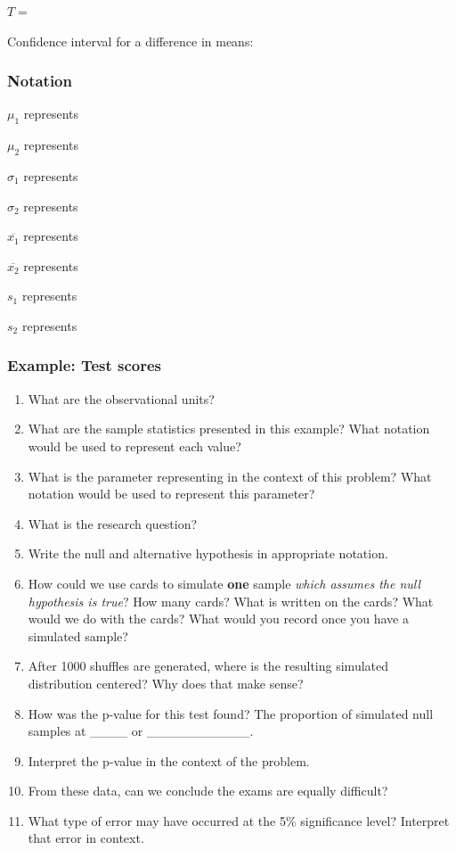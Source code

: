 \documentclass[
]{report}
\newcommand{\rgs}{\vspace{12pt}} %
\begin{document}
\(T=\)
\rgs

Confidence interval for a difference in means:
\rgs

\hypertarget{notation-4}{%
\subsubsection*{Notation}\label{notation-4}}

\(\mu_1\) represents
\rgs

\(\mu_2\) represents
\rgs

\(\sigma_1\) represents
\rgs

\(\sigma_2\) represents
\rgs

\(\overline{x_1}\) represents
\rgs

\(\overline{x_2}\) represents
\rgs

\(s_1\) represents
\rgs

\(s_2\) represents
\rgs

\hypertarget{example-test-scores}{%
\subsubsection*{Example: Test scores}\label{example-test-scores}}

\begin{enumerate}
\def\labelenumi{\arabic{enumi}.}
\item
  What are the observational units?
  \rgs
\item
  What are the sample statistics presented in this example? What notation would be used to represent each value?
  \rgs
\item
  What is the parameter representing in the context of this problem? What notation would be used to represent this parameter?
  \rgs
  \rgs
\item
  What is the research question?
  \rgs
\item
  Write the null and alternative hypothesis in appropriate notation.
  \rgs
\item
  How could we use cards to simulate \textbf{one} sample \emph{which assumes the null hypothesis is true}? How many cards? What is written on the cards? What would we do with the cards? What would you record once you have a simulated sample?
  \rgs
  \rgs
  \rgs
\item
  After 1000 shuffles are generated, where is the resulting simulated distribution centered? Why does that make sense?
  \rgs
  \rgs
\item
  How was the p-value for this test found? The proportion of simulated null samples at \_\_\_\_ or \_\_\_\_\_\_\_\_\_\_\_.
  \rgs
\item
  Interpret the p-value in the context of the problem.
  \rgs
  \rgs
\item
  From these data, can we conclude the exams are equally difficult?
  \rgs
\item
  What type of error may have occurred at the 5\% significance level? Interpret that error in context.
  \rgs
  \rgs
\end{enumerate}
\end{document}
